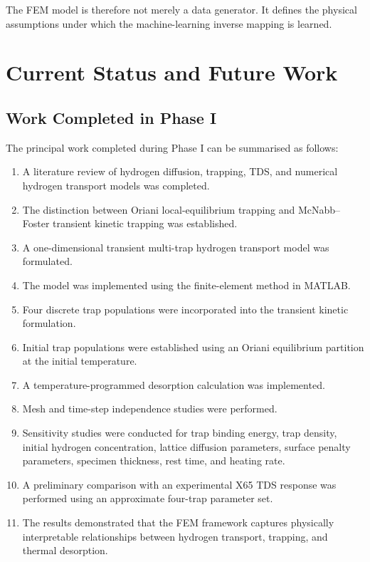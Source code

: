 \documentclass[a4paper,12pt,oneside]{report}
\begin{document}
The FEM model is therefore not merely a data generator. It defines the physical
assumptions under which the machine-learning inverse mapping is learned.
 
 
\chapter{Current Status and Future Work}
\label{ch:status}
 
\section{Work Completed in Phase I}
\label{sec:phase1}
 
The principal work completed during Phase I can be summarised as follows:
\begin{enumerate}
  \item A literature review of hydrogen diffusion, trapping, TDS, and numerical
        hydrogen transport models was completed.
  \item The distinction between Oriani local-equilibrium trapping and
        McNabb--Foster transient kinetic trapping was established.
  \item A one-dimensional transient multi-trap hydrogen transport model was
        formulated.
  \item The model was implemented using the finite-element method in MATLAB.
  \item Four discrete trap populations were incorporated into the transient kinetic
        formulation.
  \item Initial trap populations were established using an Oriani equilibrium
        partition at the initial temperature.
  \item A temperature-programmed desorption calculation was implemented.
  \item Mesh and time-step independence studies were performed.
  \item Sensitivity studies were conducted for trap binding energy, trap density,
        initial hydrogen concentration, lattice diffusion parameters, surface
        penalty parameters, specimen thickness, rest time, and heating rate.
  \item A preliminary comparison with an experimental X65 TDS response was
        performed using an approximate four-trap parameter set.
  \item The results demonstrated that the FEM framework captures physically
        interpretable relationships between hydrogen transport, trapping, and
        thermal desorption.
\end{enumerate}
 
\end{document}
